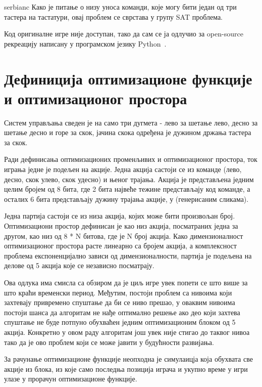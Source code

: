 \documentclass{article}
\begin{document}
\begin{otherlanguage*}{serbianc}
Како је питање о низу уноса команди, које могу бити један од три тастера на тастатури, овај проблем
се сврстава у групу SAT проблема.

Код оригиналне игре није доступан, тако да сам се ја одлучио за open-source рекреацију написану
у програмском језику Python~\cite{jkathome}.


\section{Дефиниција оптимизационе функције и оптимизационог простора}
Систем управљања сведен је на само три дугмета - лево за шетање лево, десно за шетање десно
и горе за скок, јачина скока одређена је дужином држања тастера за скок.

Ради дефинисања оптимизационих променљивих и оптимизационог простора,
ток играња једне  је подељен на акције.
Једна акција састоји се из
команде (лево, десно, скок улево, скок удесно) и њеног трајања.
Акција је представљена једним целим бројем
од 8 бита, где 2 бита највеће тежине представљају код команде, а осталих 6 бита
представљају дужину трајања акције, у (генерисаним сликама).

Једна партија састоји се из низа акција, којих може бити произвољан број.
Оптимизациони простор дефинисан је као низ акција, посматраних једна за другом,
као низ од 8 * N битова, где је N број акција.
Како димензионалност оптимизационог простора расте линеарно са бројем акција,
а комплексност проблема експоненцијално зависи од димензионалности,
партија је подељена на делове од 5 акција које се независно посматрају.

Ова одлука има смисла са обзиром да је циљ игре увек попети се што више за
што краћи временски период.
Међутим, постоји проблем са нивоима који захтевају привремено спуштање да
би се ниво прешао, у оваквим нивоима постоји шанса да алгоритам не нађе
оптимално решење ако део који захтева спуштање не буде потпуно обухваћен
једним оптимизационим блоком од 5 акција.
Конкретно у овом раду алгоритам још увек није стигао до таквог нивоа тако
да је ово проблем који се може јавити у будућности развијања.

За рачунање оптимизационе функције неопходна је симулаицја која обухвата
све акције из блока, из које само
последња позиција играча и укупно време у игри улазе у прорачун
оптимизационе функције.


\end{otherlanguage*}
\end{document}
